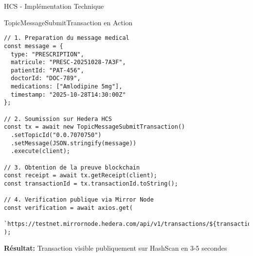 \documentclass[aspectratio=169,11pt]{beamer}
\begin{document}
\begin{frame}[fragile]{HCS - Implémentation Technique}

\begin{block}{TopicMessageSubmitTransaction en Action}
\lstset{language=JavaScript}
\begin{lstlisting}
// 1. Preparation du message medical
const message = {
  type: "PRESCRIPTION",
  matricule: "PRESC-20251028-7A3F",
  patientId: "PAT-456",
  doctorId: "DOC-789",
  medications: ["Amlodipine 5mg"],
  timestamp: "2025-10-28T14:30:00Z"
};

// 2. Soumission sur Hedera HCS
const tx = await new TopicMessageSubmitTransaction()
  .setTopicId("0.0.7070750")
  .setMessage(JSON.stringify(message))
  .execute(client);

// 3. Obtention de la preuve blockchain
const receipt = await tx.getReceipt(client);
const transactionId = tx.transactionId.toString();

// 4. Verification publique via Mirror Node
const verification = await axios.get(
  `https://testnet.mirrornode.hedera.com/api/v1/transactions/${transactionId}`
);
\end{lstlisting}
\end{block}

\begin{center}
\textcolor{successGreen}{\textbf{Résultat:}} Transaction visible publiquement sur HashScan en 3-5 secondes
\end{center}

\end{frame}
\end{document}
